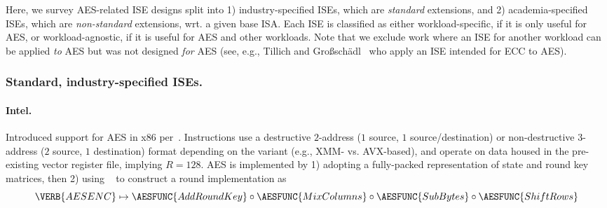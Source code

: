
Here, we survey AES-related ISE designs split into
1) industry-specified ISEs,
   which are {\em     standard} extensions,
   and
2) academia-specified ISEs,
   which are {\em non-standard} extensions,
wrt. a given base ISA.
   Each ISE is classified as either
   workload-specific,
   if it is only useful for AES,
   or
   workload-agnostic,
   if it is      useful for AES and other workloads.
Note that we exclude work where an ISE for another workload can be applied 
{\em  to} AES
but was not designed 
{\em for} AES
(see, e.g., Tillich and Gro{\ss}sch\"{a}dl~\cite{TilGro:04} who apply an ISE intended for ECC to AES).


\subsubsection{Standard, industry-specified ISEs.}

\paragraph{Intel.}
      Introduced support for AES in 
      x86
      per~\cite[Section 12.13]{X86:1:18}.
      Instructions use a
          destructive $2$-address ($1$ source, $1$ source/destination)  
      or
      non-destructive $3$-address ($2$ source, $1$        destination)
      format
      depending on the variant (e.g., XMM- vs. AVX-based),
      and operate on data housed in the pre-existing
      vector 
      register file, implying $R = 128$.
      AES is implemented by
      1) adopting a 
          fully-packed
         representation of state and round key matrices,
         then
      2) using
                      ~\cite[Page 3-54]{X86:2:18}
         to construct a round implementation as
         \[
         \VERB{AESENC} \mapsto \AESFUNC{AddRoundKey} \circ \AESFUNC{MixColumns} \circ \AESFUNC{SubBytes} \circ \AESFUNC{ShiftRows}
         \]

